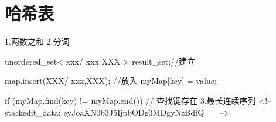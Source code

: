 \chapter{哈希表}
1.两数之和
2.分词


unordered_set< xxx/ xxx XXX > result_set;//建立

map.insert(XXX/ {xxx,XXX}); //放入
myMap[key] = value;

if (myMap.find(key) != myMap.end()) {
    // 查找键存在
}
3.最长连续序列
<!--stackedit_data:
eyJoaXN0b3J5IjpbODg3MDgyNzBdfQ==
-->